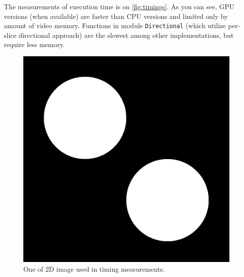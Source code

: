 \documentclass[reprint,amsmath,amssymb,aps,pre,showkeys,showpacs,nofootinbib]{revtex4-1}
\newcommand{\code}[1]{\colorbox{light-gray}{\texttt{#1}}}
\begin{document}
The measurements of execution time is on \cref{fig:timings}. As you can see, GPU
versions (when available) are faster than CPU versions and limited only by
amount of video memory. Functions in module \code{Directional} (which utilize
per-slice directional approach) are the slowest among other implementations, but
require less memory.

\begin{figure}[ht]
  \centering
  \includegraphics[width=0.6\linewidth]{images/timing-image.png}
  \caption[]{One of 2D image used in timing measurements.}
  \label{fig:valuenoise}
\end{figure}
\end{document}
